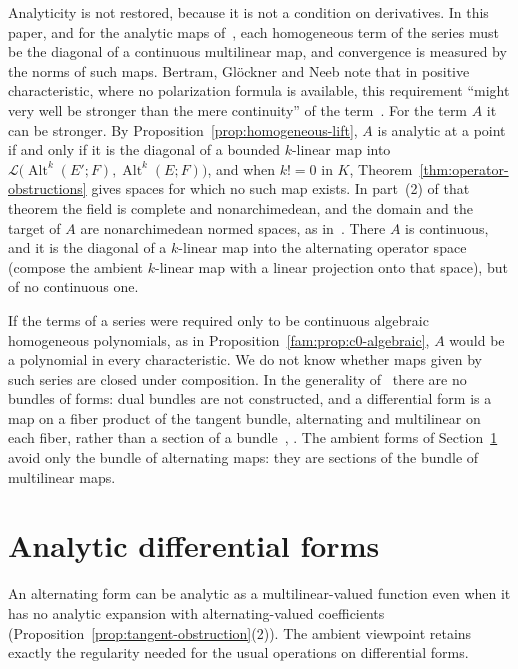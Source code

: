 \documentclass[11pt]{amsart}
\theoremstyle{definition}
\theoremstyle{remark}
\numberwithin{equation}{section}
\newcommand{\cL}{\mathcal L}
\newcommand{\Alt}{\operatorname{Alt}}
\begin{document}
Analyticity is not restored, because it is not a condition on derivatives. In this paper, and for the analytic maps
of~\cite[7.14--7.18]{BGN}, each homogeneous term of the series must be the diagonal of a continuous multilinear map, and
convergence is measured by the norms of such maps. Bertram, Gl\"ockner and Neeb note that in positive characteristic,
where no polarization formula is available, this requirement ``might very well be stronger than the mere continuity'' of
the term~\cite[footnote to~7.14]{BGN}. For the term $A$ it can be stronger. By Proposition~\ref{prop:homogeneous-lift},
$A$ is analytic at a point if and only if it is the diagonal of a bounded $k$-linear map into
$\cL\bigl(\Alt^k(E';F),\Alt^k(E;F)\bigr)$, and when $k!=0$ in $K$, Theorem~\ref{thm:operator-obstructions} gives spaces
for which no such map exists. In part~(2) of that theorem the field is complete and nonarchimedean, and the domain and
the target of $A$ are nonarchimedean normed spaces, as in~\cite[7.13]{BGN}. There $A$ is continuous, and it is the
diagonal of a $k$-linear map into the alternating operator space (compose the ambient $k$-linear map with a linear
projection onto that space), but of no continuous one.

If the terms of a series were required only to be continuous algebraic homogeneous polynomials, as in
Proposition~\ref{fam:prop:c0-algebraic}, $A$ would be a polynomial in every characteristic. We do not know whether maps
given by such series are closed under composition. In the generality of~\cite{Be,BGN} there are no bundles of forms:
dual bundles are not constructed, and a differential form is a map on a fiber product of the tangent bundle, alternating
and multilinear on each fiber, rather than a section of a bundle~\cite[\S8.3]{BGN}, \cite[4.5, 22.1 and
Appendix~L.1]{Be}. The ambient forms of Section~\ref{sec:forms} avoid only the bundle of alternating maps: they are
sections of the bundle of multilinear maps.

\section{Analytic differential forms}\label{sec:forms}

An alternating form can be analytic as a multilinear-valued function even when it has no analytic expansion with alternating-valued coefficients (Proposition~\ref{prop:tangent-obstruction}(2)). The ambient viewpoint retains exactly the regularity needed for the usual operations on differential forms.
\end{document}
